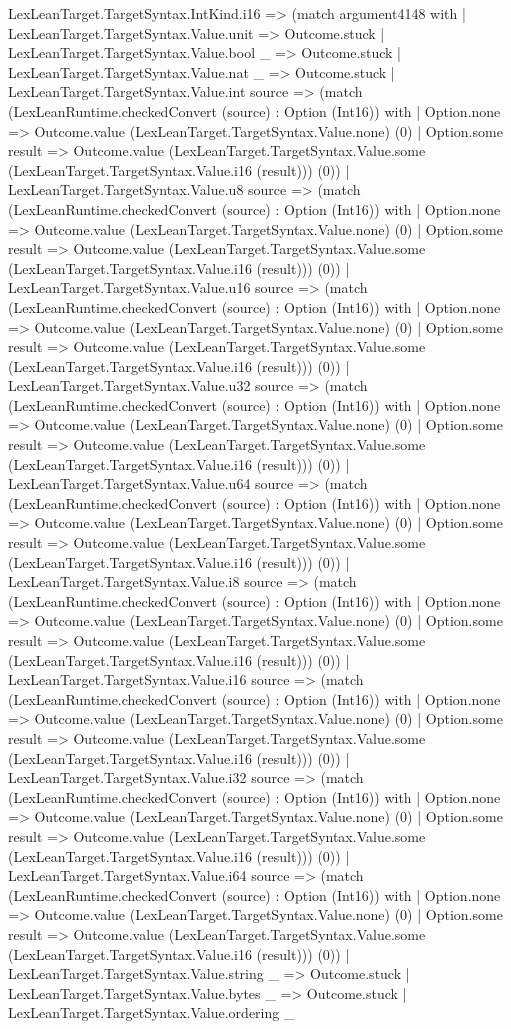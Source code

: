 \documentclass[11pt]{article}
\begin{document}
LexLeanTarget.TargetSyntax.IntKind.i16 => (match argument4148 with | LexLeanTarget.TargetSyntax.Value.unit => Outcome.stuck | LexLeanTarget.TargetSyntax.Value.bool \_ => Outcome.stuck | LexLeanTarget.TargetSyntax.Value.nat \_ => Outcome.stuck | LexLeanTarget.TargetSyntax.Value.int source => (match (LexLeanRuntime.checkedConvert (source) : Option (Int16)) with | Option.none => Outcome.value (LexLeanTarget.TargetSyntax.Value.none) (0) | Option.some result => Outcome.value (LexLeanTarget.TargetSyntax.Value.some (LexLeanTarget.TargetSyntax.Value.i16 (result))) (0)) | LexLeanTarget.TargetSyntax.Value.u8 source => (match (LexLeanRuntime.checkedConvert (source) : Option (Int16)) with | Option.none => Outcome.value (LexLeanTarget.TargetSyntax.Value.none) (0) | Option.some result => Outcome.value (LexLeanTarget.TargetSyntax.Value.some (LexLeanTarget.TargetSyntax.Value.i16 (result))) (0)) | LexLeanTarget.TargetSyntax.Value.u16 source => (match (LexLeanRuntime.checkedConvert (source) : Option (Int16)) with | Option.none => Outcome.value (LexLeanTarget.TargetSyntax.Value.none) (0) | Option.some result => Outcome.value (LexLeanTarget.TargetSyntax.Value.some (LexLeanTarget.TargetSyntax.Value.i16 (result))) (0)) | LexLeanTarget.TargetSyntax.Value.u32 source => (match (LexLeanRuntime.checkedConvert (source) : Option (Int16)) with | Option.none => Outcome.value (LexLeanTarget.TargetSyntax.Value.none) (0) | Option.some result => Outcome.value (LexLeanTarget.TargetSyntax.Value.some (LexLeanTarget.TargetSyntax.Value.i16 (result))) (0)) | LexLeanTarget.TargetSyntax.Value.u64 source => (match (LexLeanRuntime.checkedConvert (source) : Option (Int16)) with | Option.none => Outcome.value (LexLeanTarget.TargetSyntax.Value.none) (0) | Option.some result => Outcome.value (LexLeanTarget.TargetSyntax.Value.some (LexLeanTarget.TargetSyntax.Value.i16 (result))) (0)) | LexLeanTarget.TargetSyntax.Value.i8 source => (match (LexLeanRuntime.checkedConvert (source) : Option (Int16)) with | Option.none => Outcome.value (LexLeanTarget.TargetSyntax.Value.none) (0) | Option.some result => Outcome.value (LexLeanTarget.TargetSyntax.Value.some (LexLeanTarget.TargetSyntax.Value.i16 (result))) (0)) | LexLeanTarget.TargetSyntax.Value.i16 source => (match (LexLeanRuntime.checkedConvert (source) : Option (Int16)) with | Option.none => Outcome.value (LexLeanTarget.TargetSyntax.Value.none) (0) | Option.some result => Outcome.value (LexLeanTarget.TargetSyntax.Value.some (LexLeanTarget.TargetSyntax.Value.i16 (result))) (0)) | LexLeanTarget.TargetSyntax.Value.i32 source => (match (LexLeanRuntime.checkedConvert (source) : Option (Int16)) with | Option.none => Outcome.value (LexLeanTarget.TargetSyntax.Value.none) (0) | Option.some result => Outcome.value (LexLeanTarget.TargetSyntax.Value.some (LexLeanTarget.TargetSyntax.Value.i16 (result))) (0)) | LexLeanTarget.TargetSyntax.Value.i64 source => (match (LexLeanRuntime.checkedConvert (source) : Option (Int16)) with | Option.none => Outcome.value (LexLeanTarget.TargetSyntax.Value.none) (0) | Option.some result => Outcome.value (LexLeanTarget.TargetSyntax.Value.some (LexLeanTarget.TargetSyntax.Value.i16 (result))) (0)) | LexLeanTarget.TargetSyntax.Value.string \_ => Outcome.stuck | LexLeanTarget.TargetSyntax.Value.bytes \_ => Outcome.stuck | LexLeanTarget.TargetSyntax.Value.ordering \_ 
\end{document}
